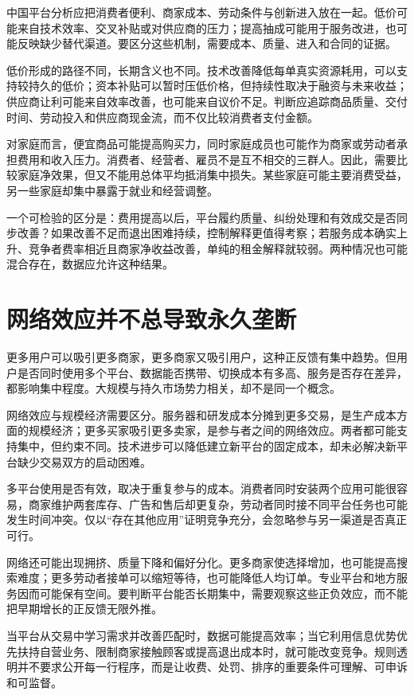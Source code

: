 \documentclass[UTF8,fontset=fandol,zihao=-4,oneside,openany]{ctexbook}
\begin{document}
中国平台分析应把消费者便利、商家成本、劳动条件与创新进入放在一起。低价可能来自技术效率、交叉补贴或对供应商的压力；提高抽成可能用于服务改进，也可能反映缺少替代渠道。要区分这些机制，需要成本、质量、进入和合同的证据。

\label{arg:P183}
低价形成的路径不同，长期含义也不同。技术改善降低每单真实资源耗用，可以支持较持久的低价；资本补贴可以暂时压低价格，但持续性取决于融资与未来收益；供应商让利可能来自效率改善，也可能来自议价不足。判断应追踪商品质量、交付时间、劳动投入和供应商现金流，而不仅比较消费者支付金额。

对家庭而言，便宜商品可能提高购买力，同时家庭成员也可能作为商家或劳动者承担费用和收入压力。消费者、经营者、雇员不是互不相交的三群人。因此，需要比较家庭净效果，但又不能用总体平均抵消集中损失。某些家庭可能主要消费受益，另一些家庭却集中暴露于就业和经营调整。

一个可检验的区分是：费用提高以后，平台履约质量、纠纷处理和有效成交是否同步改善？如果改善不足而退出困难持续，控制解释更值得考察；若服务成本确实上升、竞争者费率相近且商家净收益改善，单纯的租金解释就较弱。两种情况也可能混合存在，数据应允许这种结果。

\section{网络效应并不总导致永久垄断}
更多用户可以吸引更多商家，更多商家又吸引用户，这种正反馈有集中趋势。但用户是否同时使用多个平台、数据能否携带、切换成本有多高、服务是否存在差异，都影响集中程度。大规模与持久市场势力相关，却不是同一个概念。

\label{arg:P184}
网络效应与规模经济需要区分。服务器和研发成本分摊到更多交易，是生产成本方面的规模经济；更多买家吸引更多卖家，是参与者之间的网络效应。两者都可能支持集中，但约束不同。技术进步可以降低建立新平台的固定成本，却未必解决新平台缺少交易双方的启动困难。

多平台使用是否有效，取决于重复参与的成本。消费者同时安装两个应用可能很容易，商家维护两套库存、广告和售后却更复杂，劳动者同时接不同平台任务也可能发生时间冲突。仅以“存在其他应用”证明竞争充分，会忽略参与另一渠道是否真正可行。

网络还可能出现拥挤、质量下降和偏好分化。更多商家使选择增加，也可能提高搜索难度；更多劳动者接单可以缩短等待，也可能降低人均订单。专业平台和地方服务因而可能保有空间。要判断平台能否长期集中，需要观察这些正负效应，而不能把早期增长的正反馈无限外推。

当平台从交易中学习需求并改善匹配时，数据可能提高效率；当它利用信息优势优先扶持自营业务、限制商家接触顾客或提高退出成本时，就可能改变竞争。规则透明并不要求公开每一行程序，而是让收费、处罚、排序的重要条件可理解、可申诉和可监督。
\end{document}
